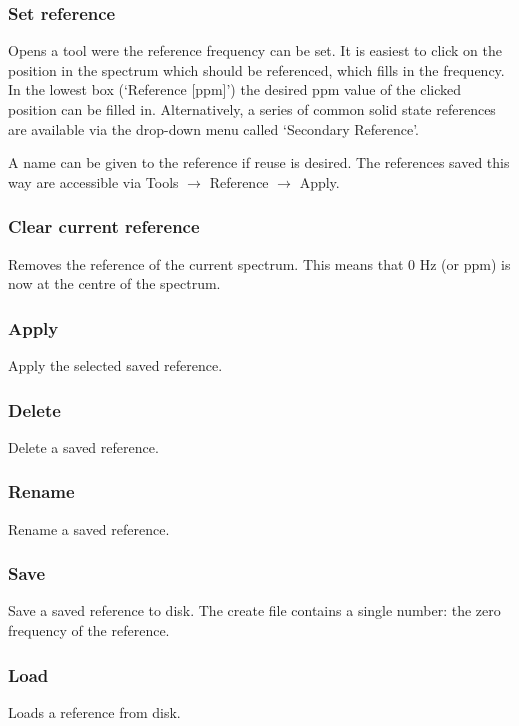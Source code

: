 \documentclass[11pt,a4paper]{article}
\begin{document}
\subsubsection{Set reference}
Opens a tool were the reference frequency can be set. It is easiest to click on the position in the spectrum
which should be referenced, which fills in the frequency. In the lowest box (`Reference [ppm]') the desired
ppm value of the clicked position can be filled in. Alternatively, a series of common solid state references
are available via the drop-down menu called `Secondary Reference'.

A name can be given to the reference if reuse is desired. The references saved this way are
accessible via Tools
$\rightarrow$ Reference $\rightarrow$ Apply.


\subsubsection{Clear current reference}
Removes the reference of the current spectrum. This means that 0 Hz (or ppm) is now at the centre of the
spectrum.

\subsubsection{Apply}
Apply the selected saved reference.

\subsubsection{Delete}
Delete a saved reference.

\subsubsection{Rename}
Rename a saved reference.

\subsubsection{Save}
Save a saved reference to disk. The create file contains a single number: the zero frequency of the reference.

\subsubsection{Load}
Loads a reference from disk.
\end{document}
